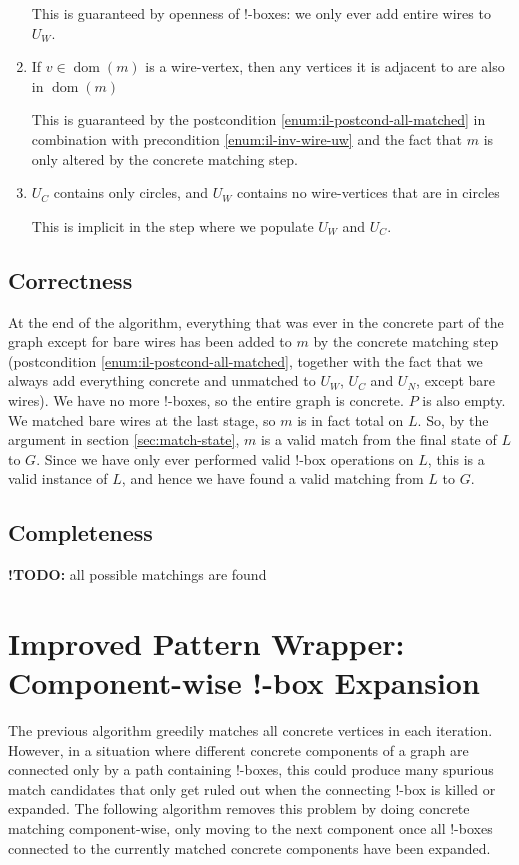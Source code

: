 \documentclass{article}
\DeclareMathOperator{\dom}{dom}
\newcommand{\TODOinline}[1]{%
\typeout{WARNING!!! there is still a TODO left}
{\color{blue}\textbf{!TODO: }#1}
}
\begin{document}
\begin{enumerate}[label=(\roman*),ref=(\roman*)]
  This is guaranteed by openness of $!$-boxes: we only ever add entire wires to $U_W$.
  \item If $v \in \dom(m)$ is a wire-vertex, then any vertices it is adjacent to are also in $\dom(m)$

  This is guaranteed by the postcondition \ref{enum:il-postcond-all-matched} in combination with precondition \ref{enum:il-inv-wire-uw} and the fact that $m$ is only altered by the concrete matching step.
  \item $U_C$ contains only circles, and $U_W$ contains no wire-vertices that are in circles

  This is implicit in the step where we populate $U_W$ and $U_C$.
\end{enumerate}

\subsection{Correctness}

At the end of the algorithm, everything that was ever in the concrete part of the graph except for bare wires has been added to $m$ by the concrete matching step (postcondition \ref{enum:il-postcond-all-matched}, together with the fact that we always add everything concrete and unmatched to $U_W$, $U_C$ and $U_N$, except bare wires).  We have no more $!$-boxes, so the entire graph is concrete.  $P$ is also empty.  We matched bare wires at the last stage, so $m$ is in fact total on $L$.  So, by the argument in section \ref{sec:match-state}, $m$ is a valid match from the final state of $L$ to $G$.  Since we have only ever performed valid $!$-box operations on $L$, this is a valid instance of $L$, and hence we have found a valid matching from $L$ to $G$.

\subsection{Completeness}

\TODOinline{all possible matchings are found}

\section{Improved Pattern Wrapper: Component-wise !-box Expansion}

The previous algorithm greedily matches all concrete vertices in each iteration. However, in a situation where different concrete components of a graph are connected only by a path containing !-boxes, this could produce many spurious match candidates that only get ruled out when the connecting !-box is killed or expanded. The following algorithm removes this problem by doing concrete matching component-wise, only moving to the next component once all !-boxes connected to the currently matched concrete components have been expanded.
\end{document}

